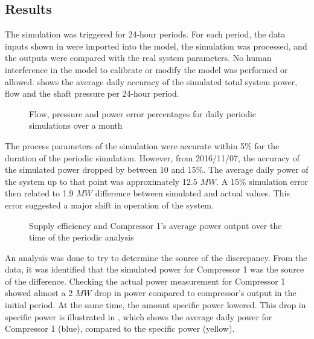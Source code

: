 \subsection{Results}

 The simulation was triggered for 24-hour periods. For each period, the data inputs shown in  were imported into the model, the simulation was processed, and the outputs were compared with the real system parameters. No human interference in the model to calibrate or modify the model was performed or allowed.  shows the average daily accuracy of the simulated total system power, flow and the shaft pressure per 24-hour period.
	 \par 
 
	\begin{figure}[h!]
		\centering
		
		\caption{Flow, pressure and power error percentages for daily periodic simulations over a month}
		\label{fig: Periodic simulation}
	\end{figure} 
The process parameters of the simulation were accurate within 5\% for the duration of the periodic simulation. However, from 2016/11/07, the accuracy of the simulated power dropped by between 10 and 15\%. The average daily power of the system up to that point was approximately 12.5 $MW$. A 15\% simulation error then related to 1.9 $MW$ difference between simulated and actual values. This error suggested a major shift in operation of the system.
\par 
\begin{figure}[h!]
	\centering
	
	\caption{Supply efficiency and Compressor 1's average power output over the time of the periodic analysis}
	\label{fig: MeasurementAccuracy.}
\end{figure} 

An analysis was done to try to determine the source of the discrepancy. From the data, it was identified that the simulated power for Compressor 1 was the source of the difference. Checking the actual power measurement for Compressor 1 showed almost a 2 $MW$ drop in power compared to compressor's output in the initial period. At the same time, the amount specific power lowered. This drop in specific power is illustrated in , which shows the average daily power for Compressor 1 (blue), compared to the specific power (yellow). 
\par
	
